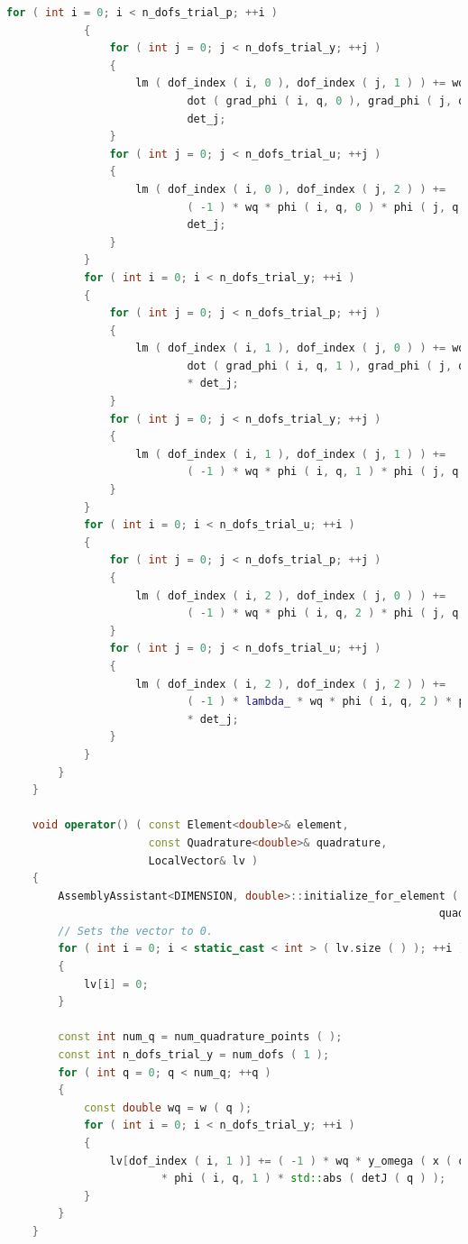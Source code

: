 \documentclass[a4paper, 11pt, twoside]{article}
\begin{document}
\begin{lstlisting}[language=C++, basicstyle={\footnotesize, \ttfamily}, keywordstyle=\color{blue}, numbers=none, tabsize=4]
            for ( int i = 0; i < n_dofs_trial_p; ++i )
            {
                for ( int j = 0; j < n_dofs_trial_y; ++j )
                {
                    lm ( dof_index ( i, 0 ), dof_index ( j, 1 ) ) += wq * 
                            dot ( grad_phi ( i, q, 0 ), grad_phi ( j, q, 1 ) ) * 
                            det_j;
                }
                for ( int j = 0; j < n_dofs_trial_u; ++j )
                {
                    lm ( dof_index ( i, 0 ), dof_index ( j, 2 ) ) +=
                            ( -1 ) * wq * phi ( i, q, 0 ) * phi ( j, q, 2 ) * 
                            det_j;
                }
            }
            for ( int i = 0; i < n_dofs_trial_y; ++i )
            {
                for ( int j = 0; j < n_dofs_trial_p; ++j )
                {
                    lm ( dof_index ( i, 1 ), dof_index ( j, 0 ) ) += wq *
                            dot ( grad_phi ( i, q, 1 ), grad_phi ( j, q, 0 ) )
                            * det_j;
                }
                for ( int j = 0; j < n_dofs_trial_y; ++j )
                {
                    lm ( dof_index ( i, 1 ), dof_index ( j, 1 ) ) +=
                            ( -1 ) * wq * phi ( i, q, 1 ) * phi ( j, q, 1 ) * det_j;
                }
            }
            for ( int i = 0; i < n_dofs_trial_u; ++i )
            {
                for ( int j = 0; j < n_dofs_trial_p; ++j )
                {
                    lm ( dof_index ( i, 2 ), dof_index ( j, 0 ) ) +=
                            ( -1 ) * wq * phi ( i, q, 2 ) * phi ( j, q, 0 ) * det_j;
                }
                for ( int j = 0; j < n_dofs_trial_u; ++j )
                {
                    lm ( dof_index ( i, 2 ), dof_index ( j, 2 ) ) +=
                            ( -1 ) * lambda_ * wq * phi ( i, q, 2 ) * phi ( j, q, 2 ) 
                            * det_j;
                }
            }
        }
    }

    void operator() ( const Element<double>& element, 
                      const Quadrature<double>& quadrature,
                      LocalVector& lv )
    {
        AssemblyAssistant<DIMENSION, double>::initialize_for_element ( element, 
                                                                   quadrature );
        // Sets the vector to 0.
        for ( int i = 0; i < static_cast < int > ( lv.size ( ) ); ++i )
        {
            lv[i] = 0;
        }

        const int num_q = num_quadrature_points ( );
        const int n_dofs_trial_y = num_dofs ( 1 );
        for ( int q = 0; q < num_q; ++q )
        {
            const double wq = w ( q );
            for ( int i = 0; i < n_dofs_trial_y; ++i )
            {
                lv[dof_index ( i, 1 )] += ( -1 ) * wq * y_omega ( x ( q ) )
                        * phi ( i, q, 1 ) * std::abs ( detJ ( q ) );
            }
        }
    }


\end{lstlisting}
\end{document}
